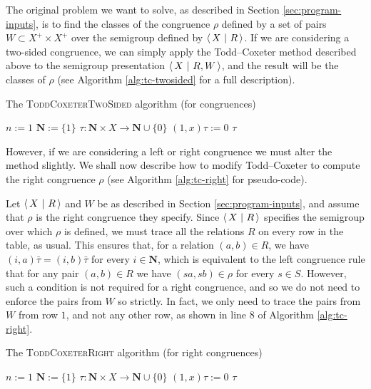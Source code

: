 The original problem we want to solve, as described in Section
\ref{sec:program-inputs}, is to find the classes of the congruence $\rho$
defined by a set of pairs $W \subset X^+ \times X^+$ over the semigroup defined
by $\left\langle\,X ~\middle|~ R\,\right\rangle$.  If we are considering
a two-sided congruence, we can simply apply the Todd--Coxeter method described
above to the semigroup presentation $\left\langle\,X ~\middle|~ R,W\,\right\rangle$, and the result will be the
classes of $\rho$ (see Algorithm \ref{alg:tc-twosided} for a full description).

\begin{algorithm}
\caption{The \textsc{ToddCoxeterTwoSided} algorithm (for congruences)}
\label{alg:tc-twosided}
\begin{algorithmic}[1]
\State $n := 1$
\State $\mathbf{N} := \{1\}$
\State $\tau : \mathbf{N} \times X \to \mathbf{N} \cup \{0\}$
  \State $(1, x)\tau := 0$
\EndFor
{}
    \State {}
  \EndFor
    \State {}
  \EndFor
\EndFor
\State \Return $\tau$
\EndProcedure
\end{algorithmic}
\end{algorithm}

However, if we are considering a left or right congruence we
must alter the method slightly.  We shall now describe how to modify
Todd--Coxeter to compute the right congruence $\rho$ (see Algorithm
\ref{alg:tc-right} for pseudo-code).

Let $\left\langle\,X ~\middle|~ R\,\right\rangle$ and $W$ be as described in Section \ref{sec:program-inputs}, and
assume that $\rho$ is the right congruence they specify.  Since
$\left\langle\,X ~\middle|~ R\,\right\rangle$ specifies the semigroup over which $\rho$ is defined, we must trace
all the relations $R$ on every row in the table, as usual.  This ensures that,
for a relation $(a,b) \in R$, we have $(i, a)\bar\tau = (i, b)\bar\tau$ for
every $i \in \mathbf{N}$, which is equivalent to the left congruence rule that
for any pair $(a,b) \in R$ we have $(sa, sb) \in \rho$ for every $s \in S$.
However, such a condition is not required for a right congruence, and so we do
not need to enforce the pairs from $W$ so strictly.  In fact, we only need to
trace the pairs from $W$ from row $1$, and not any other row, as shown in line 8
of Algorithm \ref{alg:tc-right}.

\begin{algorithm}
\caption{The \textsc{ToddCoxeterRight} algorithm (for right congruences)}
\label{alg:tc-right}
\begin{algorithmic}[1]
\State $n := 1$
\State $\mathbf{N} := \{1\}$
\State $\tau : \mathbf{N} \times X \to \mathbf{N} \cup \{0\}$
  \State $(1, x)\tau := 0$
\EndFor
{}
  \State {}
\EndFor
{}
    \State {}
  \EndFor
\EndFor
\State \Return $\tau$
\EndProcedure
\end{algorithmic}
\end{algorithm}

